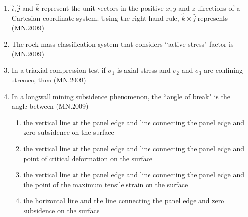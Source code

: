 \documentclass[journal]{IEEEtran}
\numberwithin{equation}{enumi}
\numberwithin{figure}{enumi}
\begin{document}
\begin{enumerate}
\item $\hat{i}, \hat{j}$ and $\hat{k}$ represent the unit vectors in the positive $x, y$ and $z$ directions of a Cartesian coordinate system. Using the right-hand rule, $\hat{k} \times \hat{j}$ represents
\hfill{(MN.2009)}
\begin{enumerate}[label=(\Alph*)]
\end{enumerate}

\item The rock mass classification system that considers ``active stress" factor is
\hfill{(MN.2009)}
\begin{enumerate}[label=(\Alph*)]
\end{enumerate}

\item In a triaxial compression test if $\sigma_1$ is axial stress and $\sigma_2$ and $\sigma_3$ are confining stresses, then
\hfill{(MN.2009)}
\begin{enumerate}[label=(\Alph*)]
\end{enumerate}

\item In a longwall mining subsidence phenomenon, the ``angle of break" is the angle between
\hfill{(MN.2009)}
\begin{enumerate}[label=(\Alph*)]
    \item the vertical line at the panel edge and line connecting the panel edge and zero subsidence on the surface
    \item the vertical line at the panel edge and line connecting the panel edge and point of critical deformation on the surface
    \item the vertical line at the panel edge and line connecting the panel edge and the point of the maximum tensile strain on the surface
    \item the horizontal line and the line connecting the panel edge and zero subsidence on the surface
\end{enumerate}


\end{enumerate}
\end{document}
